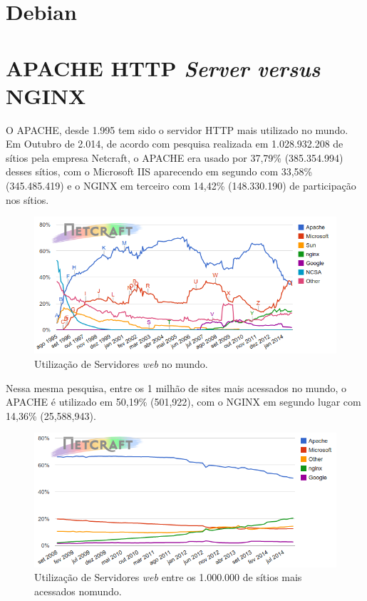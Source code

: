 \section{Debian}

\section{APACHE HTTP \textit{Server versus} NGINX}
O APACHE, desde 1.995 tem sido o servidor HTTP mais utilizado no mundo. Em Outubro de 2.014, de acordo com pesquisa realizada em 1.028.932.208 de sítios pela empresa Netcraft, o APACHE era usado por 37,79\% (385.354.994) desses sítios, com o Microsoft IIS aparecendo em segundo com 33,58\% (345.485.419) e o NGINX em terceiro com 14,42\% (148.330.190) de participação nos sítios.\\

\begin{figure}
\centering
\includegraphics[scale=0.5]{figuras/grafico1}  
\caption{Utilização de Servidores \textit{web} no mundo.}
\label{fig:webservers-utilizacao}
\end{figure}

Nessa mesma pesquisa, entre os 1 milhão de sites mais acessados no mundo, o APACHE é utilizado em 50,19\% (501,922), com o NGINX em segundo lugar com 14,36\% (25,588,943).\\

\begin{figure}
\centering
\includegraphics[scale=0.5]{figuras/grafico2} 
\caption{Utilização de Servidores \textit{web} entre os 1.000.000 de sítios mais acessados nomundo.}
\label{fig:webservers-utilizacao-milhao}
\end{figure}

